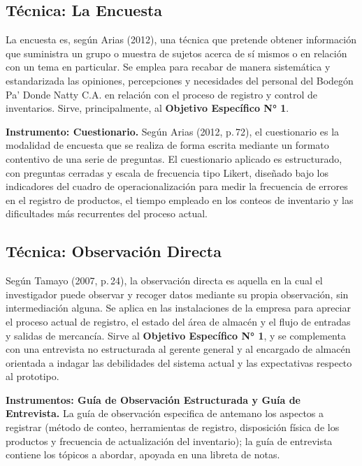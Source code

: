 \documentclass[12pt, letterpaper]{report}
\begin{document}
\subsection{Técnica: La Encuesta}

La encuesta es, según Arias (2012), una técnica que pretende obtener
información que suministra un grupo o muestra de sujetos acerca de sí
mismos o en relación con un tema en particular. Se emplea para recabar
de manera sistemática y estandarizada las opiniones, percepciones y
necesidades del personal del Bodegón Pa' Donde Natty C.A. en relación
con el proceso de registro y control de inventarios. Sirve,
principalmente, al \textbf{Objetivo Específico N° 1}.

\noindent\textbf{Instrumento: Cuestionario.} Según Arias (2012,
p.\,72), el cuestionario es la modalidad de encuesta que se realiza de
forma escrita mediante un formato contentivo de una serie de preguntas.
El cuestionario aplicado es estructurado, con preguntas cerradas y
escala de frecuencia tipo Likert, diseñado bajo los indicadores del
cuadro de operacionalización para medir la frecuencia de errores en el
registro de productos, el tiempo empleado en los conteos de inventario y
las dificultades más recurrentes del proceso actual.

\subsection{Técnica: Observación Directa}

Según Tamayo (2007, p.\,24), la observación directa es aquella en la
cual el investigador puede observar y recoger datos mediante su propia
observación, sin intermediación alguna. Se aplica en las instalaciones
de la empresa para apreciar el proceso actual de registro, el estado del
área de almacén y el flujo de entradas y salidas de mercancía. Sirve al
\textbf{Objetivo Específico N° 1}, y se complementa con una entrevista
no estructurada al gerente general y al encargado de almacén orientada
a indagar las debilidades del sistema actual y las expectativas respecto
al prototipo.

\noindent\textbf{Instrumentos: Guía de Observación Estructurada y Guía
de Entrevista.} La guía de observación especifica de antemano los
aspectos a registrar (método de conteo, herramientas de registro,
disposición física de los productos y frecuencia de actualización del
inventario); la guía de entrevista contiene los tópicos a abordar,
apoyada en una libreta de notas.
\end{document}
